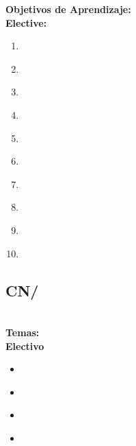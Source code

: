 \noindent \textbf{Objetivos de Aprendizaje:}\\
\noindent \textbf{Elective:}
\begin{enumerate}
	\setcounter{enumi}{0}
	\item \CNModelingandSimulationLOExplainAnd\xspace[\CNModelingandSimulationLOExplainAndLevel]\label{sec:BOK:CNModelingandSimulationLOExplainAnd}
	\item \CNModelingandSimulationLODemonstrateThe\xspace[\CNModelingandSimulationLODemonstrateTheLevel]\label{sec:BOK:CNModelingandSimulationLODemonstrateThe}
	\item \CNModelingandSimulationLOExplainTheConcepts\xspace[\CNModelingandSimulationLOExplainTheConceptsLevel]\label{sec:BOK:CNModelingandSimulationLOExplainTheConcepts}
	\item \CNModelingandSimulationLOExplainTheValidation\xspace[\CNModelingandSimulationLOExplainTheValidationLevel]\label{sec:BOK:CNModelingandSimulationLOExplainTheValidation}
	\item \CNModelingandSimulationLOVerify\xspace[\CNModelingandSimulationLOVerifyLevel]\label{sec:BOK:CNModelingandSimulationLOVerify}
	\item \CNModelingandSimulationLOEvaluateA\xspace[\CNModelingandSimulationLOEvaluateALevel]\label{sec:BOK:CNModelingandSimulationLOEvaluateA}
	\item \CNModelingandSimulationLOChoose\xspace[\CNModelingandSimulationLOChooseLevel]\label{sec:BOK:CNModelingandSimulationLOChoose}
	\item \CNModelingandSimulationLOCompareResults\xspace[\CNModelingandSimulationLOCompareResultsLevel]\label{sec:BOK:CNModelingandSimulationLOCompareResults}
	\item \CNModelingandSimulationLOInfer\xspace[\CNModelingandSimulationLOInferLevel]\label{sec:BOK:CNModelingandSimulationLOInfer}
	\item \CNModelingandSimulationLOExtend\xspace[\CNModelingandSimulationLOExtendLevel]\label{sec:BOK:CNModelingandSimulationLOExtend}
\end{enumerate}


\subsection{CN/\CNProcessing}\label{sec:BOK:CNProcessing}
\CNProcessingDescription\\
\noindent \textbf{Temas:}\\
\noindent \textbf{Electivo}
\begin{itemize}
	\item \CNProcessingTopicFundamental\label{sec:BOK:CNProcessingTopicFundamental}
	\item \CNProcessingTopicNumerical\label{sec:BOK:CNProcessingTopicNumerical}
	\item \CNProcessingTopicFundamentalProperties\label{sec:BOK:CNProcessingTopicFundamentalProperties}
	\item \CNProcessingTopicComputing\label{sec:BOK:CNProcessingTopicComputing}
\end{itemize}


